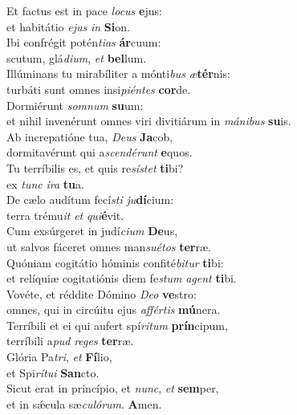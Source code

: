 \evenverse Et factus est in pace \textit{lo}\textit{cus} \textbf{e}jus:~\*\\
\evenverse et habitátio \textit{e}\textit{jus} \textit{in} \textbf{Si}on.\\
\oddverse Ibi confrégit potén\textit{ti}\textit{as} \textbf{ár}cuum:~\*\\
\oddverse scutum, glá\textit{di}\textit{um}, \textit{et} \textbf{bel}lum.\\
\evenverse Illúminans tu mirabíliter a mónti\textit{bus} \textit{æ}\textbf{tér}nis:~\*\\
\evenverse turbáti sunt omnes insi\textit{pi}\textit{én}\textit{tes} \textbf{cor}de.\\
\oddverse Dormiérunt \textit{som}\textit{num} \textbf{su}um:~\*\\
\oddverse et nihil invenérunt omnes viri divitiárum in \textit{má}\textit{ni}\textit{bus} \textbf{su}is.\\
\evenverse Ab increpatióne tua, \textit{De}\textit{us} \textbf{Ja}cob,~\*\\
\evenverse dormitavérunt qui a\textit{scen}\textit{dé}\textit{runt} \textbf{e}quos.\\
\oddverse Tu terríbilis es, et quis re\textit{sí}\textit{stet} \textbf{ti}bi?~\*\\
\oddverse ex \textit{tunc} \textit{i}\textit{ra} \textbf{tu}a.\\
\evenverse De cælo audítum fecí\textit{sti} \textit{ju}\textbf{dí}cium:~\*\\
\evenverse terra trému\textit{it} \textit{et} \textit{qui}\textbf{é}vit.\\
\oddverse Cum exsúrgeret in judí\textit{ci}\textit{um} \textbf{De}us,~\*\\
\oddverse ut salvos fáceret omnes man\textit{su}\textit{é}\textit{tos} \textbf{ter}ræ.\\
\evenverse Quóniam cogitátio hóminis confité\textit{bi}\textit{tur} \textbf{ti}bi:~\*\\
\evenverse et relíquiæ cogitatiónis diem fe\textit{stum} \textit{a}\textit{gent} \textbf{ti}bi.\\
\oddverse Vovéte, et réddite Dómino \textit{De}\textit{o} \textbf{ve}stro:~\*\\
\oddverse omnes, qui in circúitu ejus \textit{af}\textit{fér}\textit{tis} \textbf{mú}nera.\\
\evenverse Terríbili et ei qui aufert spí\textit{ri}\textit{tum} \textbf{prín}cipum,~\*\\
\evenverse terríbili a\textit{pud} \textit{re}\textit{ges} \textbf{ter}ræ.\\
\oddverse Glória Pa\textit{tri}, \textit{et} \textbf{Fí}lio,~\*\\
\oddverse et Spi\textit{rí}\textit{tu}\textit{i} \textbf{San}cto.\\
\evenverse Sicut erat in princípio, et \textit{nunc}, \textit{et} \textbf{sem}per,~\*\\
\evenverse et in sǽcula sæ\textit{cu}\textit{ló}\textit{rum}. \textbf{A}men.\\
